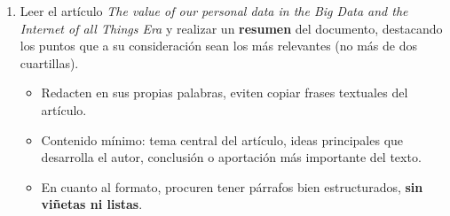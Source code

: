 \documentclass[12pt]{report}
\begin{document}
\begin{enumerate}[label=\textbf{\arabic*.}, leftmargin=*]
\begin{enumerate}[label=\textbf{\alph*.}, leftmargin=*, itemsep=1.0em]

\item Leer el art\'iculo \textit{The value of our personal data in the Big Data and the Internet of all Things Era} y realizar un \textbf{resumen} del documento, destacando los puntos que a su consideraci\'on sean los m\'as relevantes (no m\'as de dos cuartillas).
\begin{itemize}
  \item Redacten en sus propias palabras, eviten copiar frases textuales del art\'iculo.
  \item Contenido m\'inimo: tema central del art\'iculo, ideas principales que desarrolla el autor, conclusi\'on o aportaci\'on m\'as importante del texto.
  \item En cuanto al formato, procuren tener p\'arrafos bien estructurados, \textbf{sin vi\~netas ni listas}.
\end{itemize}


\end{enumerate}
\end{enumerate}
\end{document}
